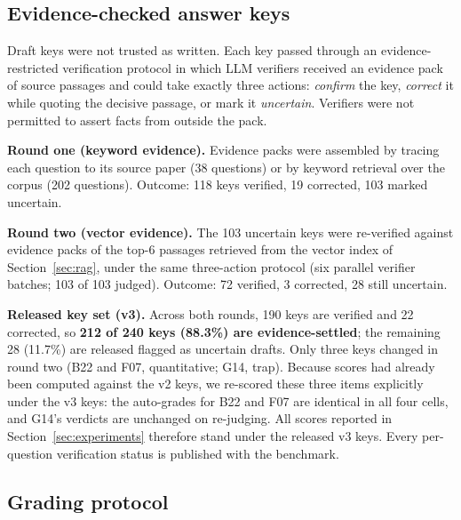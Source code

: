 \documentclass[11pt]{article}
\begin{document}
\subsection{Evidence-checked answer keys}
\label{sec:keys}

Draft keys were not trusted as written. Each key passed through an
evidence-restricted verification protocol in which LLM verifiers received
an evidence pack of source passages and could take exactly three actions:
\emph{confirm} the key, \emph{correct} it while quoting the decisive
passage, or mark it \emph{uncertain}. Verifiers were not permitted to
assert facts from outside the pack.

\textbf{Round one (keyword evidence).} Evidence packs were assembled by
tracing each question to its source paper (38 questions) or by keyword
retrieval over the corpus (202 questions). Outcome: 118 keys verified,
19 corrected, 103 marked uncertain.

\textbf{Round two (vector evidence).} The 103 uncertain keys were
re-verified against evidence packs of the top-6 passages retrieved from
the vector index of Section~\ref{sec:rag}, under the same three-action
protocol (six parallel verifier batches; 103 of 103 judged). Outcome:
72 verified, 3 corrected, 28 still uncertain.

\textbf{Released key set (v3).} Across both rounds, 190 keys are verified
and 22 corrected, so \textbf{212 of 240 keys (88.3\%) are
evidence-settled}; the remaining 28 (11.7\%) are released flagged as
uncertain drafts. Only three keys changed in round two (B22 and F07,
quantitative; G14, trap). Because scores had already been computed
against the v2 keys, we re-scored these three items explicitly under the
v3 keys: the auto-grades for B22 and F07 are identical in all four cells,
and G14's verdicts are unchanged on re-judging. All scores reported in
Section~\ref{sec:experiments} therefore stand under the released v3 keys.
Every per-question verification status is published with the benchmark.

\subsection{Grading protocol}
\label{sec:grading}
\end{document}
